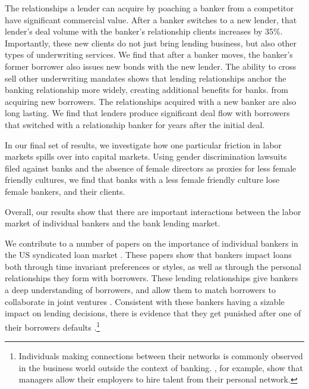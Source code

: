 The relationships a lender can acquire by poaching a banker from a competitor have significant commercial value. After a banker switches to a new lender, that lender's deal volume with the banker's relationship clients increases by 35\%. %
Importantly, these new clients do not just bring lending business, but also other types of underwriting services. We find that after a banker moves, the banker's former borrower also issues new bonds with the new lender. %
The ability to cross sell other underwriting mandates shows that lending relationships anchor the banking relationship more widely, creating additional benefits for banks. from acquiring new borrowers.
The relationships acquired with a new banker are also long lasting. We find that lenders produce significant deal flow with borrowers that switched with a relationship banker for years after the initial deal. 

In our final set of results, we investigate how one particular friction in labor markets spills over into capital markets. Using gender discrimination lawsuits filed against banks and the absence of female directors as proxies for less female friendly cultures, we find that banks with a less female friendly culture lose female bankers, and their clients. 

Overall, our results show that there are important interactions between the labor market of individual bankers and the bank lending market. %


We contribute to a number of papers on the importance of individual bankers in the US syndicated loan market \citep{Herpfer.2018, Bushman2019}. These papers show that bankers impact loans both through time invariant preferences or styles, as well as through the personal relationships they form with borrowers. These lending relationships give bankers a deep understanding of borrowers, and allow them to match borrowers to collaborate in joint ventures \citep{Frattaroli2019}. Consistent with these bankers having a sizable impact on lending decisions, there is evidence that they get punished after one of their borrowers defaults \citep{Gao.2018b}.\footnote{Individuals making connections between their networks is commonly observed in the business world outside the context of banking. \citet{Hacamo2019}, for example, show that managers allow their employers to hire talent from their personal network.}

